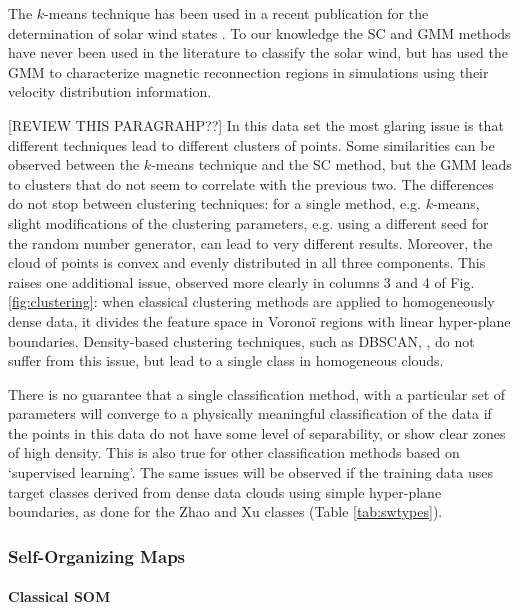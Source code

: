 The $k$-means technique has been used in a recent publication for the determination of solar wind states \citep{Roberts2020}. To our knowledge the SC and GMM methods have never been used in the literature to classify the solar wind, but \citep{Dupuis2020} has used the GMM to characterize magnetic reconnection regions in simulations using their velocity distribution information.

[REVIEW THIS PARAGRAHP??]
In this data set the most glaring issue is that different techniques lead to different clusters of points. Some similarities can be observed between the $k$-means technique and the SC method, but the GMM leads to clusters that do not seem to correlate with the previous two. The differences do not stop between clustering techniques: for a single method, e.g. $k$-means, slight modifications of the clustering parameters, e.g. using a different seed for the random number generator, can lead to very different results. Moreover, the cloud of points is convex and evenly distributed in all three components. This raises one additional issue, observed more clearly in columns 3 and 4 of Fig.\ref{fig:clustering}: when classical clustering methods are applied to homogeneously dense data, it divides the feature space in Vorono\"i regions with linear hyper-plane boundaries. Density-based clustering techniques, such as DBSCAN, \citep{[REF newDBSCAN paper??]}, do not suffer from this issue, but lead to a single class in homogeneous clouds.

There is no guarantee that a single classification method, with a particular set of parameters will converge to a physically meaningful classification of the data if the points in this data do not have some level of separability, or show clear zones of high density. This is also true for other classification methods based on `supervised learning'. The same issues will be observed if the training data uses target classes derived from dense data clouds using simple hyper-plane boundaries, as done for the Zhao and Xu classes (Table \ref{tab:swtypes}).

\subsubsection{Self-Organizing Maps}

\paragraph{Classical SOM}

